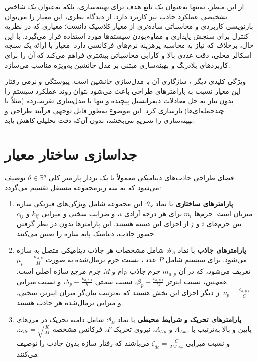 از این منظر،  نه‌تنها به‌عنوان یک تابع هدف برای بهینه‌سازی، بلکه به‌عنوان یک شاخص تشخیصی عملکرد جاذب نیز کاربرد دارد. از دیدگاه نظری، این معیار را می‌توان بازنویسی کاربردی و محاسباتی ساده‌تری از معیار کلاسیک  دانست؛ معیاری که در نظریه کنترل برای سنجش پایداری و مقاوم‌بودن سیستم‌ها مورد استفاده قرار می‌گیرد. با این حال، برخلاف  که نیاز به محاسبه پرهزینه نرم‌های فرکانسی دارد، معیار  با ارائه یک سنجه اسکالر محلی، دقت عددی بالا و کارایی محاسباتی بیشتری فراهم می‌کند که آن را برای کاربردهای بلادرنگ و بهینه‌سازی مبتنی بر مدل جانشین به‌ویژه مناسب می‌سازد.

ویژگی کلیدی دیگر ، سازگاری آن با مدل‌سازی جانشین است. پیوستگی و نرمی رفتار این معیار نسبت به پارامترهای طراحی باعث می‌شود بتوان روند عملکرد سیستم را بدون نیاز به حل معادلات دیفرانسیل پیچیده و تنها با مدل‌سازی تقریب‌زده (مثلاً با چندجمله‌ای‌ها) بازسازی کرد. این موضوع به‌طور قابل توجهی فرآیند طراحی و بهینه‌سازی را تسریع می‌بخشد، بدون آن‌که دقت تحلیلی کاهش یابد.

\section{جداسازی ساختار معیار }

فضای طراحی جاذب‌های دینامیکی معمولاً با یک بردار پارامتر کلی $\theta \in \mathbb{R}^q$ توصیف می‌شود که به سه زیرمجموعه مستقل تقسیم می‌گردد:


\begin{enumerate}
  \item \textbf{پارامترهای ساختاری} با نماد $\theta_S$: این مجموعه شامل ویژگی‌های فیزیکی سازه میزبان است. جرم‌ها $m_i$ برای هر درجه آزادی $i$، و ضرایب سختی و میرایی $k_{ij}$ و $c_{ij}$ بین جرم‌های $i$ و $j$ از اجزای این دسته هستند. این پارامترها بدون در نظر گرفتن حضور جاذب، دینامیک پایه سازه را تعیین می‌کنند.

  \item \textbf{پارامترهای جاذب} با نماد $\theta_A$: شامل مشخصات هر جاذب دینامیکی متصل به سازه می‌شود. برای سیستم شامل $P$ عدد ، نسبت جرم نرمال‌شده به صورت $\mu_p = \frac{m_{a,p}}{M}$ تعریف می‌شود، که در آن $m_{a,p}$ جرم جاذب $p$ام و $M$ جرم مرجع سازه اصلی است. همچنین، نسبت اینرتر $\beta_p = \frac{b_{a,p,l}}{M}$، نسبت سختی $\lambda_p = \frac{k_{a,p,l}}{K}$، و نسبت میرایی $\nu_p = \frac{c_{a,p,l}}{C}$ از دیگر اجزای این بخش هستند که به‌ترتیب بیان‌گر میزان اینرتر، سختی، و میرایی نرمال‌شده هر جاذب هستند.

  \item \textbf{پارامترهای تحریک و شرایط محیطی} با نماد $\theta_E$: شامل دامنه تحریک در مرزهای پایین و بالا به‌ترتیب با $A_{Low}$ و $A_{Up}$، نیروی تحریک $F$، فرکانس مشخصه $\omega_{dc} = \sqrt{\frac{K}{M}}$، و نسبت میرایی $\zeta_{dc} = \frac{C}{2M\omega_{dc}}$ می‌باشند که رفتار سازه بدون جاذب را توصیف می‌کنند.
\end{enumerate}

